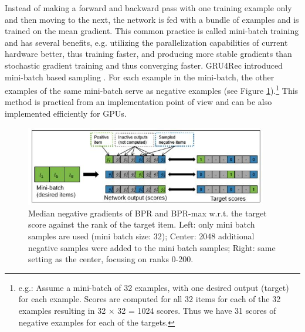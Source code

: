 \documentclass{article} %
\begin{document}
Instead of making a forward and backward pass with one training example only and then moving
to the next, the network is fed with a bundle of examples and is trained on the mean gradient. This
common practice is called mini-batch training and has several benefits, e.g. utilizing the parallelization capabilities of current hardware better, thus training faster, and producing more stable gradients
than stochastic gradient training and thus converging faster. GRU4Rec introduced mini-batch based
sampling \cite{hidasi2015session}. For each example in the mini-batch, the other examples of the same
mini-batch serve as negative examples (see Figure \ref{fig:p1}).\footnote[3]{
e.g.: Assume a mini-batch of 32 examples, with one desired output (target) for each example. Scores are
computed for all 32 items for each of the 32 examples resulting in 32 × 32 = 1024 scores. Thus we have 31
scores of negative examples for each of the targets.} 
This method is practical from an implementation point of view and can be also implemented efficiently for GPUs.

\graphicspath{{img/}}

\begin{figure}[htp]
    \centering
    \includegraphics[width=400]{img/p1.JPG}
    \caption{Median negative gradients of BPR and BPR-max w.r.t. the target score against the rank of the target item. Left: only mini batch samples are used (mini batch size: 32); Center: 2048 additional negative samples were added to the mini batch samples; Right: same setting as the center, focusing on ranks 0-200.}
    \label{fig:p1}
\end{figure}
\end{document}
